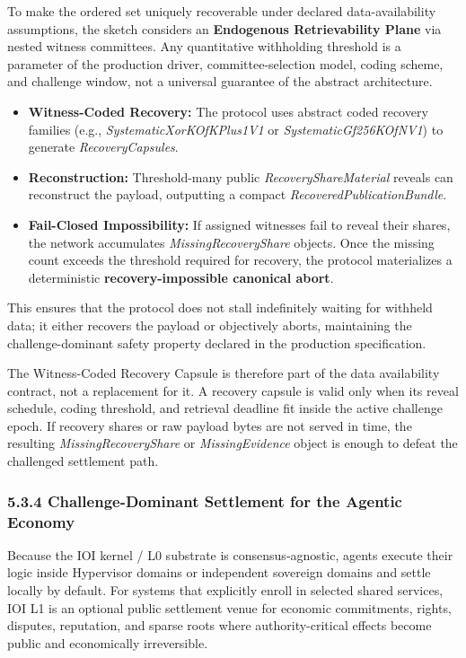 \documentclass[
  11pt,
]{article}
\providecommand{\tightlist}{%
  \setlength{\itemsep}{0pt}\setlength{\parskip}{0pt}}
\begin{document}
To make the ordered set uniquely recoverable under declared
data-availability assumptions, the sketch considers an
\textbf{Endogenous Retrievability Plane} via nested witness committees.
Any quantitative withholding threshold is a parameter of the production
driver, committee-selection model, coding scheme, and challenge window,
not a universal guarantee of the abstract architecture.

\begin{itemize}
\tightlist
\item
  \textbf{Witness-Coded Recovery:} The protocol uses abstract coded
  recovery families (e.g., \emph{SystematicXorKOfKPlus1V1} or
  \emph{SystematicGf256KOfNV1}) to generate \emph{RecoveryCapsules}.
\item
  \textbf{Reconstruction:} Threshold-many public
  \emph{RecoveryShareMaterial} reveals can reconstruct the payload,
  outputting a compact \emph{RecoveredPublicationBundle}.
\item
  \textbf{Fail-Closed Impossibility:} If assigned witnesses fail to
  reveal their shares, the network accumulates
  \emph{MissingRecoveryShare} objects. Once the missing count exceeds
  the threshold required for recovery, the protocol materializes a
  deterministic \textbf{recovery-impossible canonical abort}.
\end{itemize}

This ensures that the protocol does not stall indefinitely waiting for
withheld data; it either recovers the payload or objectively aborts,
maintaining the challenge-dominant safety property declared in the
production specification.

The Witness-Coded Recovery Capsule is therefore part of the data
availability contract, not a replacement for it. A recovery capsule is
valid only when its reveal schedule, coding threshold, and retrieval
deadline fit inside the active challenge epoch. If recovery shares or
raw payload bytes are not served in time, the resulting
\emph{MissingRecoveryShare} or \emph{MissingEvidence} object is enough
to defeat the challenged settlement path.

\hypertarget{challenge-dominant-settlement-for-the-agentic-economy}{%
\subsubsection{5.3.4 Challenge-Dominant Settlement for the Agentic
Economy}\label{challenge-dominant-settlement-for-the-agentic-economy}}

Because the IOI kernel / L0 substrate is consensus-agnostic, agents
execute their logic inside Hypervisor domains or independent sovereign
domains and settle locally by default. For systems that explicitly enroll
in selected shared services, IOI L1 is an optional public settlement venue
for economic commitments, rights, disputes, reputation, and sparse roots
where authority-critical effects become public and economically
irreversible.
\end{document}
